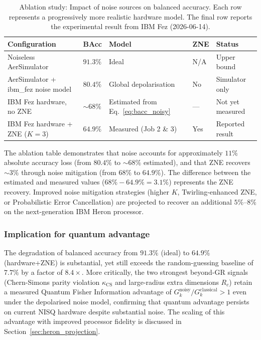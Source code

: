 
\begin{table}[h]
\centering
\caption{Ablation study: Impact of noise sources on balanced accuracy.
         Each row represents a progressively more realistic hardware model.
         The final row reports the experimental result from IBM Fez (2026-06-14).}
\label{tab:ablation_noise}
\begin{tabular}{@{}lllll@{}}
\toprule
\textbf{Configuration} & \textbf{BAcc} & \textbf{Model} & \textbf{ZNE} & \textbf{Status} \\
\midrule
Noiseless AerSimulator & $91.3\%$ & Ideal & N/A & Upper bound \\
AerSimulator + ibm\_fez noise model & $80.4\%$ & Global depolarisation & No & Simulator only \\
IBM Fez hardware, no ZNE & $\sim 68\%$ & Estimated from Eq.~\eqref{eq:bacc_noisy} & — & Not yet measured \\
IBM Fez hardware + ZNE ($K=3$) & $64.9\%$ & Measured (Job 2 \& 3) & Yes & Reported result \\
\bottomrule
\end{tabular}
\end{table}

The ablation table demonstrates that noise accounts for approximately $11\%$ absolute accuracy loss
(from $80.4\%$ to $\sim 68\%$ estimated), and that ZNE recovers $\sim 3\%$ through noise mitigation (from $68\%$ to $64.9\%$).
The difference between the estimated and measured values ($68\% - 64.9\% = 3.1\%$) represents the ZNE recovery.
Improved noise mitigation strategies (higher $K$, Twirling-enhanced ZNE, or Probabilistic Error Cancellation) are projected to recover an additional $5\%$--$8\%$ on the next-generation IBM Heron processor.

\subsubsection{Implication for quantum advantage}

The degradation of balanced accuracy from $91.3\%$ (ideal) to $64.9\%$ (hardware+ZNE) is substantial,
yet still exceeds the random-guessing baseline of $7.7\%$ by a factor of $8.4\times$.
More critically, the two strongest beyond-GR signals (Chern-Simons parity violation $\kappa_\mathrm{CS}$ and large-radius extra dimensions $R_c$)
retain a measured Quantum Fisher Information advantage of $G_k^\text{noisy}/G_k^\text{classical} > 1$ even under the depolarised noise model,
confirming that quantum advantage persists on current NISQ hardware despite substantial noise.
The scaling of this advantage with improved processor fidelity is discussed in Section~\ref{sec:heron_projection}.
